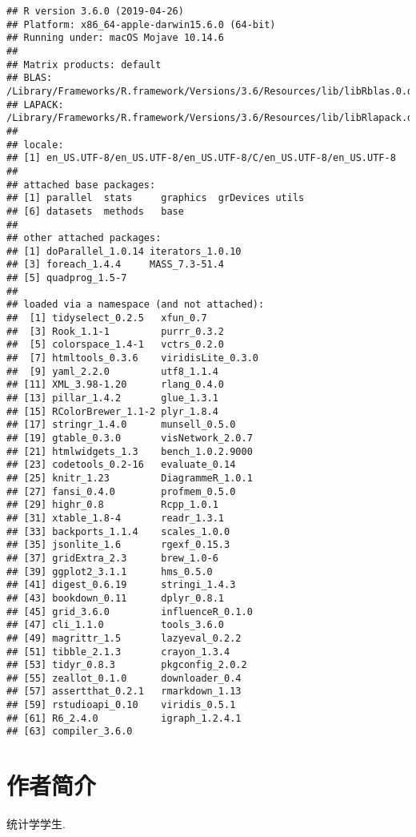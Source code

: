\documentclass[]{ctexbook}
\begin{document}
\begin{verbatim}
## R version 3.6.0 (2019-04-26)
## Platform: x86_64-apple-darwin15.6.0 (64-bit)
## Running under: macOS Mojave 10.14.6
## 
## Matrix products: default
## BLAS:   /Library/Frameworks/R.framework/Versions/3.6/Resources/lib/libRblas.0.dylib
## LAPACK: /Library/Frameworks/R.framework/Versions/3.6/Resources/lib/libRlapack.dylib
## 
## locale:
## [1] en_US.UTF-8/en_US.UTF-8/en_US.UTF-8/C/en_US.UTF-8/en_US.UTF-8
## 
## attached base packages:
## [1] parallel  stats     graphics  grDevices utils    
## [6] datasets  methods   base     
## 
## other attached packages:
## [1] doParallel_1.0.14 iterators_1.0.10 
## [3] foreach_1.4.4     MASS_7.3-51.4    
## [5] quadprog_1.5-7   
## 
## loaded via a namespace (and not attached):
##  [1] tidyselect_0.2.5   xfun_0.7          
##  [3] Rook_1.1-1         purrr_0.3.2       
##  [5] colorspace_1.4-1   vctrs_0.2.0       
##  [7] htmltools_0.3.6    viridisLite_0.3.0 
##  [9] yaml_2.2.0         utf8_1.1.4        
## [11] XML_3.98-1.20      rlang_0.4.0       
## [13] pillar_1.4.2       glue_1.3.1        
## [15] RColorBrewer_1.1-2 plyr_1.8.4        
## [17] stringr_1.4.0      munsell_0.5.0     
## [19] gtable_0.3.0       visNetwork_2.0.7  
## [21] htmlwidgets_1.3    bench_1.0.2.9000  
## [23] codetools_0.2-16   evaluate_0.14     
## [25] knitr_1.23         DiagrammeR_1.0.1  
## [27] fansi_0.4.0        profmem_0.5.0     
## [29] highr_0.8          Rcpp_1.0.1        
## [31] xtable_1.8-4       readr_1.3.1       
## [33] backports_1.1.4    scales_1.0.0      
## [35] jsonlite_1.6       rgexf_0.15.3      
## [37] gridExtra_2.3      brew_1.0-6        
## [39] ggplot2_3.1.1      hms_0.5.0         
## [41] digest_0.6.19      stringi_1.4.3     
## [43] bookdown_0.11      dplyr_0.8.1       
## [45] grid_3.6.0         influenceR_0.1.0  
## [47] cli_1.1.0          tools_3.6.0       
## [49] magrittr_1.5       lazyeval_0.2.2    
## [51] tibble_2.1.3       crayon_1.3.4      
## [53] tidyr_0.8.3        pkgconfig_2.0.2   
## [55] zeallot_0.1.0      downloader_0.4    
## [57] assertthat_0.2.1   rmarkdown_1.13    
## [59] rstudioapi_0.10    viridis_0.5.1     
## [61] R6_2.4.0           igraph_1.2.4.1    
## [63] compiler_3.6.0
\end{verbatim}

\hypertarget{author}{%
\chapter*{作者简介}\label{author}}


统计学学生.
\end{document}
